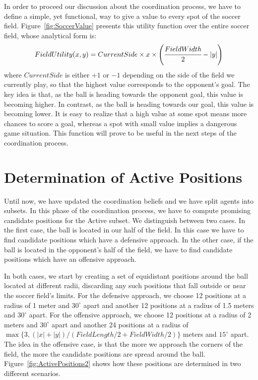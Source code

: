 In order to proceed our discussion about the coordination process, we have to define a simple, yet functional, way to give a value to every spot of the soccer field. Figure~\ref{fig:SoccerValue} presents this utility function over the entire soccer field, whose analytical form is: 
\[
FieldUtility(x,y) = CurrentSide \times x \times \left(\cfrac{FieldWidth}{2} - |y|\right) 
\]
where $CurrentSide$ is either $+1$ or $-1$ depending on the side of the field we currently play, so that the highest value corresponds to the opponent's goal. 
The key idea is that, as the ball is heading towards the opponent goal, this value is becoming higher. In contrast, as the ball is heading towards our goal, this value is becoming lower. It is easy to realize that a high value at some spot means more chances to score a goal, whereas a spot with small value implies a dangerous game situation. This function will prove to be useful in the next steps of the coordination process.




\section{Determination of Active Positions}
Until now, we have updated the coordination beliefs and we have split agents into subsets. In this phase of the coordination process, we have to compute promising candidate positions for the Active subset. We distinguish between two cases. In the first case, the ball is located in our half of the field. In this case we have to find candidate positions which have a defensive approach. In the other case, if the ball is located in the opponent's half of the field, we have to find candidate positions which have an offensive approach. 

In both cases, we start by creating a set of equidistant positions around the ball located at different radii, discarding any such positions that fall outside or near the soccer field's limits. For the defensive approach, we choose 12 positions at a radius of 1 meter and $30^\circ$ apart and another 12 positions at a radius of 1.5 meters and $30^\circ$ apart. For the offensive approach, we choose 12 positions at a radius of 2 meters and $30^\circ$ apart and another 24 positions at a radius of $\max\{3,(|x|+|y|)/(FieldLength/2+FieldWidth/2)\}$ meters and $15^\circ$ apart. The idea in the offensive case, is that the more we approach the corners of the field, the more the candidate positions are spread around the ball. Figure~\ref{fig:ActivePositions2} shows how these positions are determined in two different scenarios. 



